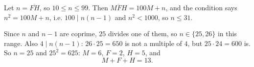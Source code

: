 Let $n=\overline{FH}$, so $10\le n\le99$. Then $\overline{MFH}=100M+n$, and the condition says $n^2=100M+n$, i.e. $100\mid n(n-1)$ and $n^2<1000$, so $n\le31$.

Since $n$ and $n-1$ are coprime, $25$ divides one of them, so $n\in\{25,26\}$ in this range. Also $4\mid n(n-1)$: $26\cdot25=650$ is not a multiple of $4$, but $25\cdot24=600$ is. So $n=25$ and $25^2=625$: $M=6$, $F=2$, $H=5$, and
\[M+F+H=\boxed{13}.\]
